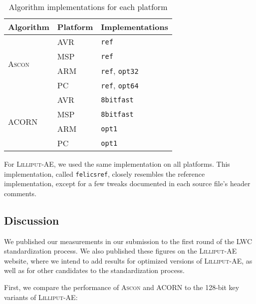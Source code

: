 \documentclass{article}
\begin{document}
\begin{table}[H]
  \centering
  \begin{tabular}{l|l|l}
    \textbf{Algorithm} & \textbf{Platform} & \textbf{Implementations}     \\
    \hline
    \multirow{4}{*}{\textsc{Ascon}}
                       & AVR               & \texttt{ref}                 \\
                       & MSP               & \texttt{ref}                 \\
                       & ARM               & \texttt{ref}, \texttt{opt32} \\
                       & PC                & \texttt{ref}, \texttt{opt64} \\
    \hline
    \multirow{4}{*}{\textsc{ACORN}}
                       & AVR               & \texttt{8bitfast}            \\
                       & MSP               & \texttt{8bitfast}            \\
                       & ARM               & \texttt{opt1}                \\
                       & PC                & \texttt{opt1}                \\
    \hline
  \end{tabular}
  \caption{Algorithm implementations for each platform}
  \label{table:results/implems}
\end{table}

For \textsc{Lilliput-AE}, we used the same implementation on all
platforms.  This implementation, called \texttt{felicsref}, closely
resembles the reference implementation, except for a few tweaks
documented in each source file's header comments.

\subsection{Discussion}

We published our measurements in our submission to the first round of
the LWC standardization process\cite{NIST:Lilliput-AE}.  We also
published these figures on the \textsc{Lilliput-AE}
website\cite{PACLIDO:Lilliput-AE}, where we intend to add results for
optimized versions of \textsc{Lilliput-AE}, as well as for other
candidates to the standardization process.

First, we compare the performance of \textsc{Ascon} and ACORN to the
128-bit key variants of \textsc{Lilliput-AE}:
\end{document}

